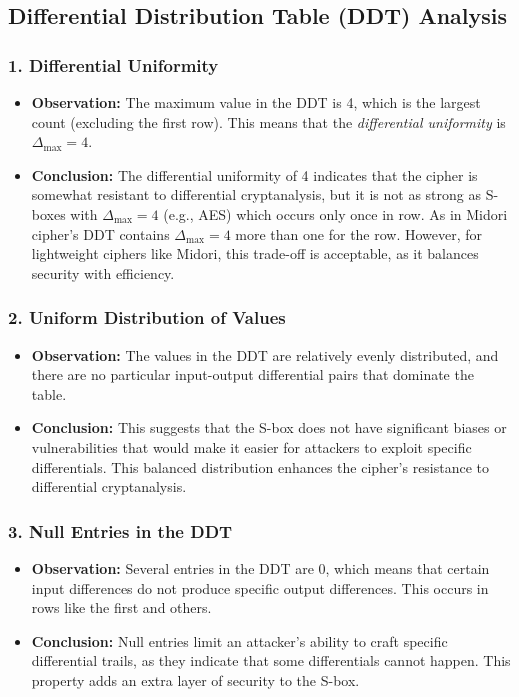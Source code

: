 \documentclass[10pt, a4paper]{article}
\begin{document}
\subsection*{Differential Distribution Table (DDT) Analysis}

\subsubsection*{1. Differential Uniformity}
\begin{itemize}
	\item \textbf{Observation:} The maximum value in the DDT is 4, which is the
	      largest count (excluding the first row). This means that the
	      \textit{differential uniformity} is \( \Delta_{\text{max}} = 4 \).

	\item \textbf{Conclusion:} The differential uniformity of 4 indicates that
	      the cipher is somewhat resistant to differential cryptanalysis, but it is
	      not as strong as S-boxes with \( \Delta_{\text{max}} = 4 \) (e.g., AES)
	      which occurs only once in row.  As in Midori cipher's DDT contains  \(
	      \Delta_{\text{max}} = 4 \) more than one for the row.  However, for
	      lightweight ciphers like Midori, this trade-off is acceptable, as it
	      balances security with efficiency.
\end{itemize}

\subsubsection*{2. Uniform Distribution of Values}
\begin{itemize}
	\item
	      \textbf{Observation:} The values in the DDT are relatively evenly distributed,
	      and there are no particular input-output differential pairs that dominate the
	      table.
	\item
	      \textbf{Conclusion:} This suggests that the S-box does not have significant
	      biases or vulnerabilities that would make it easier for attackers to exploit
	      specific differentials. This balanced distribution enhances the cipher's
	      resistance to differential cryptanalysis.
\end{itemize}

\subsubsection*{3. Null Entries in the DDT}
\begin{itemize}
	\item
	      \textbf{Observation:} Several entries in the DDT are 0, which means
	      that certain input differences do not produce specific output
	      differences. This occurs in rows like the first and others.
	\item
	      \textbf{Conclusion:} Null entries limit an attacker’s ability to craft
	      specific differential trails, as they indicate that some differentials
	      cannot happen. This property adds an extra layer of security to the
	      S-box.
\end{itemize}
\end{document}
